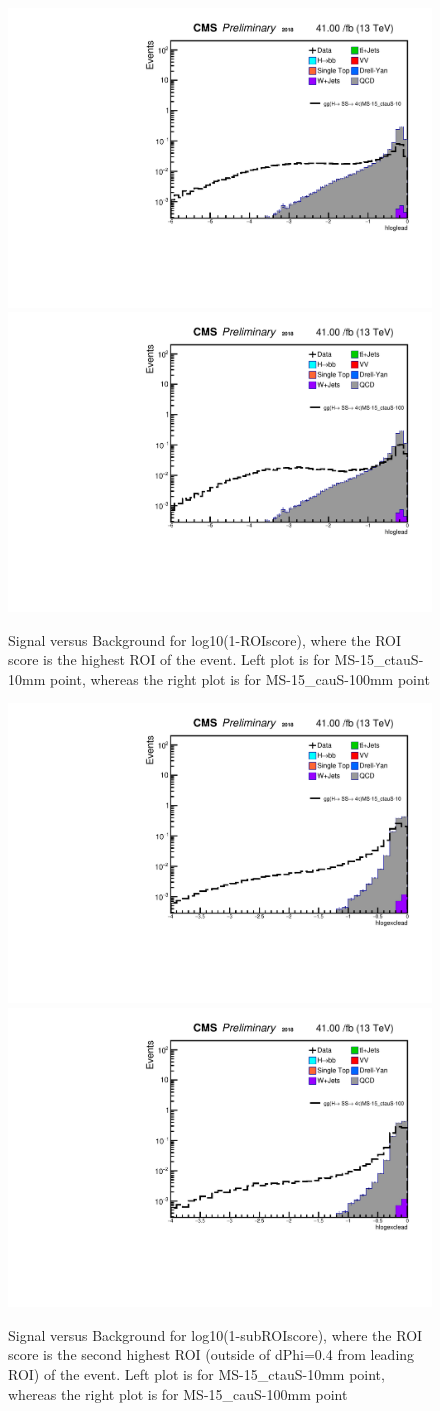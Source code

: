  \begin{figure}[h!]
   \caption{Signal versus Background for log10(1-ROIscore), where the ROI score is the highest ROI of the event. Left plot is for MS-15\_ctauS-10mm point, whereas the right plot is for MS-15\_cauS-100mm point}
   \label{fig:leadROIscore}
   \centering
   \includegraphics[width=0.47\linewidth]{figs/AnalysisNoteplot_MS-15_ctauS-10_hloglead.pdf}
   \includegraphics[width=0.47\linewidth]{figs/AnalysisNoteplot_MS-15_ctauS-100_hloglead.pdf}
 \end{figure}


 \begin{figure}[h!]
   \caption{Signal versus Background for log10(1-subROIscore), where the ROI score is the second highest ROI (outside of dPhi=0.4 from leading ROI) of the event. Left plot is for MS-15\_ctauS-10mm point, whereas the right plot is for MS-15\_cauS-100mm point}
   \label{fig:excROIscore}
   \centering
   \includegraphics[width=0.47\linewidth]{figs/AnalysisNoteplot_MS-15_ctauS-10_hlogexclead.pdf}
   \includegraphics[width=0.47\linewidth]{figs/AnalysisNoteplot_MS-15_ctauS-100_hlogexclead.pdf}
 \end{figure}


